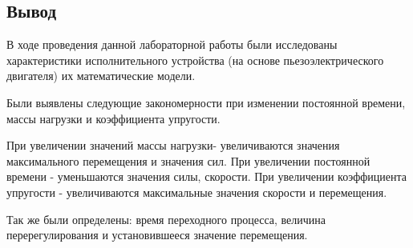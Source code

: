 \documentclass[12pt, a4paper]{article}
\begin{document}
\newpage
\begin{center}
\section*{Вывод} 
\end{center}
 \par 
В ходе проведения данной лабораторной работы были исследованы характеристики исполнительного устройства (на 
основе пьезоэлектрического двигателя) их математические модели.
\par Были выявлены следующие закономерности при изменении постоянной времени, массы нагрузки и коэффициента упругости.
\par При увеличении значений массы нагрузки- увеличиваются значения максимального перемещения и значения сил.
При увеличении постоянной времени - уменьшаются значения силы, скорости.
При увеличении коэффициента упругости - увеличиваются максимальные значения скорости и перемещения.
\par Так же были определены: время переходного процесса, величина перерегулирования и установившееся значение перемещения.  
\end{document}
